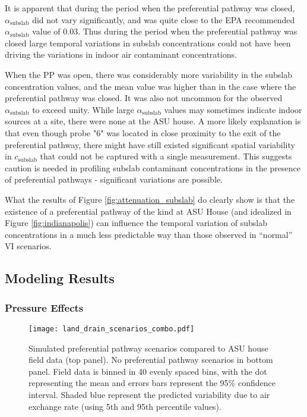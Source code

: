 \documentclass[journal=esthag,manuscript=article]{achemso}
\begin{document}
It is apparent that during the period when the preferential pathway was closed, $\alpha_\mathrm{subslab}$ did not vary significantly, and was quite close to the EPA recommended $\alpha_\mathrm{subslab}$ value of 0.03\cite{u.s._environmental_protection_agency_oswer_2015}.
Thus during the period when the preferential pathway was closed large temporal variations in subslab concentrations could not have been driving the variations in indoor air contaminant concentrations.\par

When the PP was open, there was considerably more variability in the subslab concentration values, and the mean value was higher than in the case where the preferential pathway was closed.
It was also not uncommon for the observed $\alpha_\mathrm{subslab}$ to exceed unity.
While large $\alpha_\mathrm{subslab}$ values may sometimes indicate indoor sources at a site, there were none at the ASU house.
A more likely explanation is that even though probe "6" was located in close proximity to the exit of the preferential pathway, there might have still existed significant spatial variability in $c_\mathrm{subslab}$ that could not be captured with a single measurement.
This suggests caution is needed in profiling subslab contaminant concentrations in the presence of preferential pathways - significant variations are possible.\par

What the results of Figure \ref{fig:attenuation_subslab} do clearly show is that the existence of a preferential pathway of the kind at ASU House (and idealized in Figure \ref{fig:indianapolis}) can influence the temporal variation of subslab concentrations in a much less predictable way than those observed in “normal” VI scenarios.\par

\subsection{Modeling Results}

\subsubsection{Pressure Effects}

\begin{figure}[htb!]
 \centering
 \caption{Simulated preferential pathway scenarios compared to ASU house field data (top panel). No preferential pathway scenarios in bottom panel. Field data is binned in 40 evenly spaced bins, with the dot representing the mean and errors bars represent the 95\% confidence interval. Shaded blue represent the predicted variability due to air exchange rate (using 5th and 95th percentile values).}\label{fig:land_drain_scenarios}
 \texttt{[image: land\_drain\_scenarios\_combo.pdf]}
\end{figure}
\end{document}
